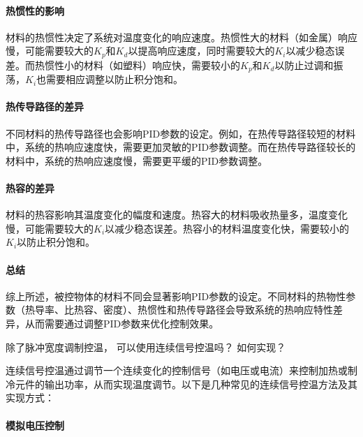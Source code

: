 \documentclass[dvipsnames, svgnames,a4paper,11pt]{article}
\begin{document}
\paragraph*{热惯性的影响}

材料的热惯性决定了系统对温度变化的响应速度。热惯性大的材料（如金属）响应慢，可能需要较大的$K_p$和$K_d$以提高响应速度，同时需要较大的$K_i$以减少稳态误差。而热惯性小的材料（如塑料）响应快，需要较小的$K_p$和$K_d$以防止过调和振荡，$K_i$也需要相应调整以防止积分饱和。

\paragraph*{热传导路径的差异}

不同材料的热传导路径也会影响PID参数的设定。例如，在热传导路径较短的材料中，系统的热响应速度快，需要更加灵敏的PID参数调整。而在热传导路径较长的材料中，系统的热响应速度慢，需要更平缓的PID参数调整。

\paragraph*{热容的差异}

材料的热容影响其温度变化的幅度和速度。热容大的材料吸收热量多，温度变化慢，可能需要较大的$K_i$以减少稳态误差。热容小的材料温度变化快，需要较小的$K_i$以防止积分饱和。

\paragraph*{总结}

综上所述，被控物体的材料不同会显著影响PID参数的设定。不同材料的热物性参数（热导率、比热容、密度）、热惯性和热传导路径会导致系统的热响应特性差异，从而需要通过调整PID参数来优化控制效果。




\begin{question}
	除了脉冲宽度调制控温， 可以使用连续信号控温吗？ 如何实现？
\end{question}



连续信号控温通过调节一个连续变化的控制信号（如电压或电流）来控制加热或制冷元件的输出功率，从而实现温度调节。以下是几种常见的连续信号控温方法及其实现方式：

\paragraph*{模拟电压控制}
\end{document}
